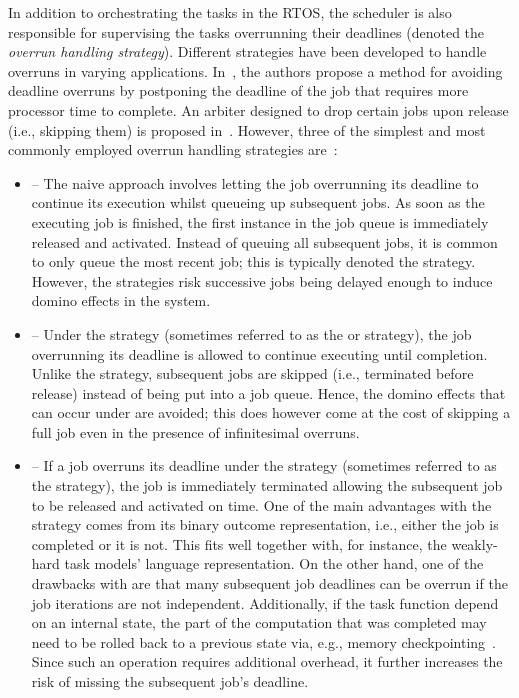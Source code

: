 In addition to orchestrating the tasks in the RTOS, the scheduler is also responsible for supervising the tasks overrunning their deadlines (denoted the \emph{overrun handling strategy}).
Different strategies have been developed to handle overruns in varying applications.
In~\cite{Caccamo:2002}, the authors propose a method for avoiding deadline overruns by postponing the deadline of the job that requires more processor time to complete.
An arbiter designed to drop certain jobs upon release (i.e., skipping them) is proposed in~\cite{Yoshimoto:2011}.
However, three of the simplest and most commonly employed overrun handling strategies are~\cite{Cervin:2004b}:
%
\begin{itemize}
    \item \tQ{} -- The naive approach involves letting the job overrunning its deadline to continue its execution whilst queueing up subsequent jobs.
        As soon as the executing job is finished, the first instance in the job queue is immediately released and activated.
        Instead of queuing all subsequent jobs, it is common to only queue the most recent job; this is typically denoted the \tQ{} strategy.
        However, the \tQ{} strategies risk successive jobs being delayed enough to induce domino effects in the system.

    \item \tS{} -- Under the \tS{} strategy (sometimes referred to as the  or  strategy), the job overrunning its deadline is allowed to continue executing until completion.
        Unlike the \tQ{} strategy, subsequent jobs are skipped (i.e., terminated before release) instead of being put into a job queue.
        Hence, the domino effects that can occur under \tQ{} are avoided; this does however come at the cost of skipping a full job even in the presence of infinitesimal overruns.

    \item \tK{} -- If a job overruns its deadline under the \tK{} strategy (sometimes referred to as the  strategy), the job is immediately terminated allowing the subsequent job to be released and activated on time.
        One of the main advantages with the \tK{} strategy comes from its binary outcome representation, i.e., either the job is completed or it is not.
        This fits well together with, for instance, the weakly-hard task models' language representation.
        On the other hand, one of the drawbacks with \tK{} are that many subsequent job deadlines can be overrun if the job iterations are not independent.
        Additionally, if the task function depend on an internal state, the part of the computation that was completed may need to be rolled back to a previous state via, e.g., memory checkpointing~\addref{}.
        Since such an operation requires additional overhead, it further increases the risk of missing the subsequent job's deadline.
\end{itemize}
